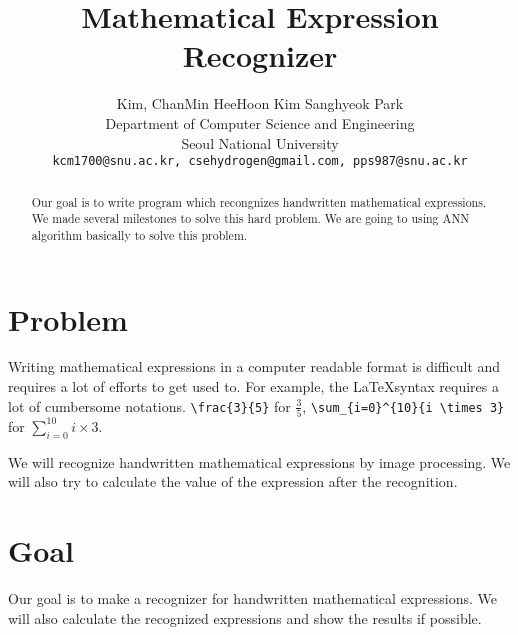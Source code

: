 \documentclass[10pt,twocolumn,letterpaper]{article}
\begin{document}
\title{Mathematical Expression Recognizer}

\author{Kim, ChanMin \qquad HeeHoon Kim \qquad Sanghyeok Park\\
Department of Computer Science and Engineering\\
Seoul National University\\
{\tt\small kcm1700@snu.ac.kr, csehydrogen@gmail.com, pps987@snu.ac.kr}
}

\maketitle

\begin{abstract}

Our goal is to write program which recongnizes handwritten mathematical expressions.
We made several milestones to solve this hard problem.
We are going to using ANN algorithm basically to solve this problem.

\end{abstract}

\section{Problem}

Writing mathematical expressions in a computer readable format is difficult and requires a lot of efforts to get used to.
For example, the \LaTeX syntax requires a lot of cumbersome notations. \verb'\frac{3}{5}' for $\frac{3}{5}$, \verb'\sum_{i=0}^{10}{i \times 3}' for $\sum_{i=0}^{10}{i \times 3}$.

We will recognize handwritten mathematical expressions by image processing.
We will also try to calculate the value of the expression after the recognition.



\section{Goal}

Our goal is to make a recognizer for handwritten mathematical expressions. We will also calculate the recognized expressions and show the results if possible.
\end{document}
